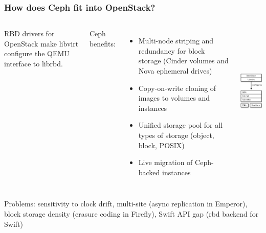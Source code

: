 \documentclass[hyperref=unicode,utf8,xcolor=pst]{beamer}
\begin{document}
\begin{frame}
	\frametitle{How does Ceph fit into OpenStack?}
	\begin{columns}
		RBD drivers for OpenStack make libvirt configure the
		QEMU interface to librbd.

		\vspace{2ex}
		Ceph benefits:
		\begin{itemize}
			\item Multi-node striping and redundancy for
				block storage (Cinder volumes and Nova
				ephemeral drives)
			\item Copy-on-write cloning of images to
				volumes and instances
			\item Unified storage pool for all types of
				storage (object, block, POSIX)
			\item Live migration of Ceph-backed instances
		\end{itemize}

		\includegraphics[height=6.5cm]{ceph-rbd-openstack}
	\end{columns}

	\vspace{2ex}
	Problems: sensitivity to clock drift, multi-site (async
	replication in Emperor), block storage density (erasure coding
	in Firefly), Swift API gap (rbd backend for Swift)
\end{frame}
\end{document}
